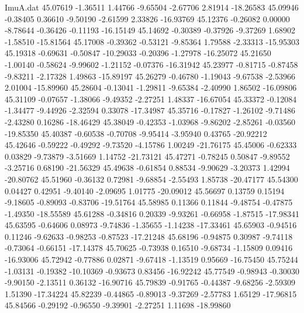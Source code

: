 \begin{filecontents}{ImuA.dat}
  45.07619   -1.36511    1.44766   -9.65504   -2.67706    2.81914  -18.26583
  45.09946   -0.38405    0.36610   -9.50190   -2.61599    2.33826  -16.93769
  45.12376   -0.26082    0.00000   -8.78644   -0.36426   -0.11193  -16.15149
  45.14692   -0.30389   -0.37926   -9.37269    1.68902   -1.58510  -15.81564
  45.17008   -0.39362   -0.53121   -9.85364    1.79588   -2.33313  -15.95303
  45.19318   -0.69631   -0.50847  -10.29033   -0.20396   -1.27978  -16.25072
  45.21650   -1.00140   -0.58624   -9.99602   -1.21152   -0.07376  -16.31942
  45.23977   -0.81715   -0.87458   -9.83211   -2.17328    1.49863  -15.89197
  45.26279   -0.46780   -1.19043   -9.67538   -2.53966    2.01004  -15.89960
  45.28604   -0.13041   -1.29811   -9.65384   -2.40990    1.86502  -16.09806
  45.31109   -0.07657   -1.38066   -9.49352   -2.27251    1.48337  -16.67054
  45.33372   -0.12084   -1.34477   -9.44926   -2.32594    0.33078  -17.34987
  45.35716   -0.17827   -1.26102   -9.71486   -2.43280    0.16286  -18.46429
  45.38049   -0.42353   -1.03968   -9.86202   -2.85261   -0.03560  -19.85350
  45.40387   -0.60538   -0.70708   -9.95414   -3.95940    0.43765  -20.92212
  45.42646   -0.59222   -0.49292   -9.73520   -4.15786    1.00249  -21.76175
  45.45006   -0.62333    0.03829   -9.73879   -3.51669    1.14752  -21.73121
  45.47271   -0.78245    0.50847   -9.89552   -3.25716    0.68190  -21.56329
  45.49638   -0.61854    0.88534   -9.90629   -3.20373    1.42994  -20.80762
  45.51960   -0.36132    0.72981   -9.68854   -2.55493    1.85738  -20.47177
  45.54300    0.04427    0.42951   -9.40140   -2.09695    1.01775  -20.09012
  45.56697    0.13759    0.15194   -9.18605   -0.89093   -0.83706  -19.51764
  45.58985    0.11366    0.11844   -9.48754   -0.47875   -1.49350  -18.55589
  45.61288   -0.34816    0.20339   -9.93261   -0.66958   -1.87515  -17.98341
  45.63595   -0.64606    0.08973   -9.74836   -1.35655   -1.14238  -17.33461
  45.65903   -0.94516    0.11246   -9.62633   -0.98253   -0.87523  -17.21248
  45.68196   -0.94875    0.30987   -9.74118   -0.73064   -0.66151  -17.14378
  45.70625   -0.73938    0.16510   -9.68734   -1.15809    0.09416  -16.93006
  45.72942   -0.77886    0.02871   -9.67418   -1.13519    0.95669  -16.75450
  45.75244   -1.03131   -0.19382  -10.10369   -0.93673    0.83456  -16.92242
  45.77549   -0.98943   -0.30030   -9.90150   -2.13511    0.36132  -16.90716
  45.79839   -0.91765   -0.44387   -9.68256   -2.59309    1.51390  -17.34224
  45.82239   -0.44865   -0.89013   -9.37269   -2.57783    1.65129  -17.96815
  45.84566   -0.29192   -0.96550   -9.39901   -2.27251    1.11698  -18.99860

\end{filecontents}
